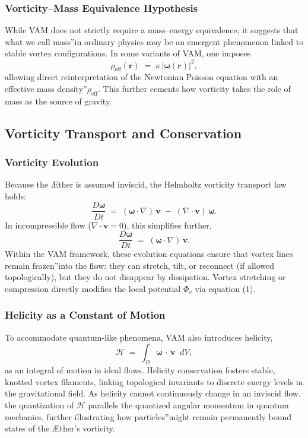 \subsubsection{Vorticity–Mass Equivalence Hypothesis}

While VAM does not strictly require a mass–energy equivalence, it suggests that what we call \grqq mass\textquotedblright in ordinary physics may be an emergent phenomenon linked to stable vortex configurations. In some variants of VAM, one imposes
\[
    \rho_{\mathrm{eff}}(\mathbf{r}) \;=\; \kappa \,\lvert \boldsymbol{\omega}(\mathbf{r}) \rvert^2,
\]
allowing direct reinterpretation of the Newtonian Poisson equation with an \grqq effective mass density\textquotedblright \(\rho_{\mathrm{eff}}\). This further cements how vorticity takes the role of mass as the source of gravity.

\subsection{Vorticity Transport and Conservation}

\subsubsection{Vorticity Evolution}

Because the Æther is assumed inviscid, the Helmholtz vorticity transport law holds:
\[
    \frac{D \boldsymbol{\omega}}{Dt}
    \;=\;
    (\boldsymbol{\omega} \cdot \nabla)\,\mathbf{v}
    \;-\;
    (\nabla \cdot \mathbf{v})\,\boldsymbol{\omega}.
\]
In incompressible flow (\(\nabla \cdot \mathbf{v} = 0\)), this simplifies further,
\[
    \frac{D \boldsymbol{\omega}}{Dt}
    \;=\;
    (\boldsymbol{\omega} \cdot \nabla)\,\mathbf{v}.
\]
Within the VAM framework, these evolution equations ensure that vortex lines remain \grqq frozen\textquotedblright into the flow: they can stretch, tilt, or reconnect (if allowed topologically), but they do not disappear by dissipation. Vortex stretching or compression directly modifies the local potential \(\Phi_v\) via equation (1).

\subsubsection{Helicity as a Constant of Motion}

To accommodate quantum-like phenomena, VAM also introduces helicity,
\[
    \mathcal{H} \;=\; \int_{\Omega} \boldsymbol{\omega} \,\cdot\, \mathbf{v} \;\;dV,
\]
as an integral of motion in ideal flows. Helicity conservation fosters stable, knotted vortex filaments, linking topological invariants to discrete energy levels in the gravitational field. As helicity cannot continuously change in an inviscid flow, the quantization of \(\mathcal{H}\) parallels the quantized angular momentum in quantum mechanics, further illustrating how \grqq particles\textquotedblright might remain permanently bound states of the Æther's vorticity.

